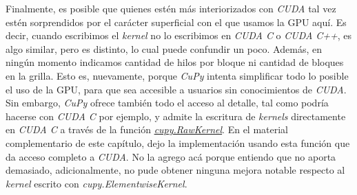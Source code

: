 Finalmente, es posible que quienes estén más interiorizados con \textit{CUDA} tal vez estén sorprendidos por el carácter superficial con el que 
usamos la GPU aquí. Es decir, cuando escribimos el \textit{kernel} no lo escribimos en \textit{CUDA C} o \textit{CUDA C++}, es algo similar, pero 
es distinto, lo cual puede confundir un poco. Además, en ningún momento indicamos cantidad de hilos por bloque ni cantidad de bloques en la grilla. 
Esto es, nuevamente, porque \textit{CuPy} intenta simplificar todo lo posible el uso de la GPU, para que sea accesible a usuarios sin conocimientos 
de \textit{CUDA}. Sin embargo, \textit{CuPy} ofrece también todo el acceso al detalle, tal como podría hacerse con \textit{CUDA C} por ejemplo,
y admite la escritura de \textit{kernels} directamente en \textit{CUDA C} a través de la función 
\href{https://docs.cupy.dev/en/stable/user_guide/kernel.html}{\textit{cupy.RawKernel}}. En el material complementario de este capítulo, dejo la 
implementación usando esta función que da acceso completo a \textit{CUDA}. No la agrego acá porque entiendo que no aporta demasiado, adicionalmente, no 
pude obtener ninguna mejora notable respecto al \textit{kernel} escrito con \textit{cupy.ElementwiseKernel}.











